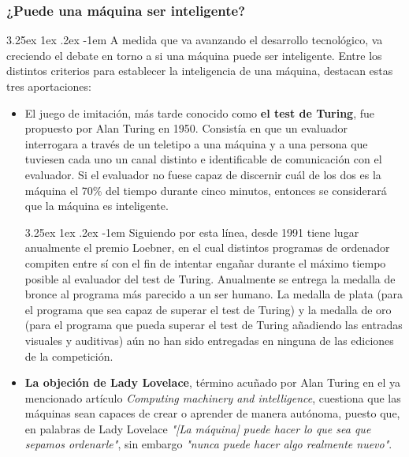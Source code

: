 \documentclass{article}
\makeatletter
\newcommand{\comment}[1]{}
\renewcommand\paragraph{\@startsection{paragraph}{5}{\z@}%
  {3.25ex \@plus1ex \@minus.2ex}%
  {-1em}%
  {\normalfont\normalsize\bfseries}}
\makeatother
\begin{document}
        \subsubsection{¿Puede una máquina ser inteligente?}

\paragraph{}
A medida que va avanzando el desarrollo tecnológico, va creciendo el debate en torno a si una máquina puede ser inteligente. \comment{Ponerlo menos difuso, citar fuentes del debate etc}Entre los distintos criterios para establecer la inteligencia de una máquina, destacan estas tres aportaciones:
\begin{itemize}
    \item El juego de imitación, más tarde conocido como \textbf{el test de Turing}, fue propuesto por Alan Turing en 1950\cite{testTuring}. Consistía en que un evaluador interrogara a través de un teletipo a una máquina y a una persona que tuviesen cada uno un canal distinto e identificable de comunicación con el evaluador. Si el evaluador no fuese capaz de discernir cuál de los dos es la máquina el 70\% del tiempo durante cinco minutos, entonces se considerará que la máquina es inteligente.
    
    \paragraph{}
    Siguiendo por esta línea, desde 1991 tiene lugar anualmente el premio Loebner, \cite{premioLoebner} en el cual distintos programas de ordenador compiten entre sí con el fin de intentar engañar durante el máximo tiempo posible al evaluador del test de Turing. Anualmente se entrega la medalla de bronce al programa más parecido a un ser humano. La medalla de plata (para el programa que sea capaz de superar el test de Turing) y la medalla de oro (para el programa que pueda superar el test de Turing añadiendo las entradas visuales y auditivas) aún no han sido entregadas en ninguna de las ediciones de la competición.\comment{Añadir más citas, concretar más}
    
    \item \textbf{La objeción de Lady Lovelace}, término acuñado por Alan Turing en el ya mencionado artículo \textit{Computing machinery and intelligence}\comment{Vuelvo a referenciar al artículo citado?}, cuestiona que las máquinas sean capaces de crear o aprender de manera autónoma, puesto que, en palabras de Lady Lovelace \textit{"[La máquina] puede hacer lo que sea que sepamos ordenarle"}, sin embargo \textit{"nunca puede hacer algo realmente nuevo"}\cite{artLadyLovelace}.
    

\end{itemize}
\end{document}
